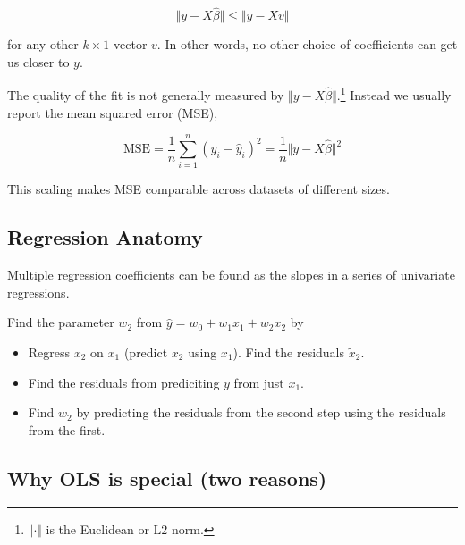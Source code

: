 \begin{equation}
\Vert y - X\hat{\beta} \Vert \leq \Vert y - Xv \Vert
\label{eq:orthogonal-projection}
\end{equation}

for any other $k \times 1$ vector $v$. In other words, no other choice of coefficients can get us closer to $y$.

The quality of the fit is not generally measured by $\Vert y - X\hat{\beta} \Vert$.\footnote{$\Vert \cdot \Vert$ is the Euclidean or L2 norm.} Instead we usually report the mean squared error (MSE),

\begin{equation}
\mathrm{MSE} = \frac{1}{n} \sum_{i=1}^n (y_i - \hat{y}_i)^2 = \frac{1}{n}\Vert y - X\hat{\beta} \Vert^2
\label{eq:mse-linear}
\end{equation}

This scaling makes MSE comparable across datasets of different sizes.

\subsection{Regression Anatomy}

Multiple regression coefficients can be found as the slopes in a series of univariate regressions. 

Find the parameter $w_2$ from $\hat{y} = w_0 + w_1x_1 + w_2x_2$ by 

\begin{itemize}
\item Regress $x_2$ on $x_1$ (predict $x_2$ using $x_1$). Find the residuals $\tilde{x}_2$.

\item Find the residuals from prediciting $y$ from just $x_1$. 

\item Find $w_2$ by predicting the residuals from the second step using the residuals from the first. 

\end{itemize}

\subsection{Why OLS is special (two reasons)}


